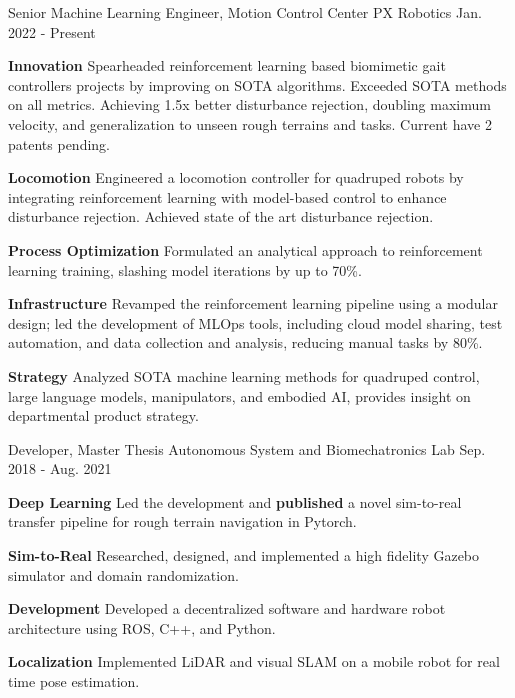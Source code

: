 \begin{cventries}
	\cventry
	{Senior Machine Learning Engineer, Motion Control Center}
	{PX Robotics}
	{Jan. 2022 - Present}
	{}
	{
		\begin{cvitems}
			\item {
				\textbf{Innovation} Spearheaded reinforcement learning based biomimetic gait controllers projects by improving on SOTA algorithms. Exceeded SOTA methods on all metrics. Achieving 1.5x better disturbance rejection, doubling maximum velocity, and generalization to unseen rough terrains and tasks. Current have 2 patents pending.
			}
			\item {
				\textbf{Locomotion} Engineered a locomotion controller for quadruped robots by integrating reinforcement learning with model-based control to enhance disturbance rejection. Achieved state of the art disturbance rejection.
			}
			\item {
				\textbf{Process Optimization} Formulated an analytical approach to reinforcement learning training, slashing model iterations by up to 70\%.
			}
			\item {
				\textbf{Infrastructure} Revamped the reinforcement learning pipeline using a modular design; led the development of MLOps tools, including cloud model sharing, test automation, and data collection and analysis, reducing manual tasks by 80\%.
			}
			\item {
				\textbf{Strategy} Analyzed SOTA machine learning methods for quadruped control, large language models, manipulators, and embodied AI, provides insight on departmental product strategy.
			}
		\end{cvitems}
	}
	\cventry
	{Developer, Master Thesis}
	{Autonomous System and Biomechatronics Lab}
	{Sep. 2018 - Aug. 2021}
	{}
	{
		\begin{cvitems}
			\item {
				\textbf{Deep Learning} Led the development and \textbf{published} a novel sim-to-real transfer pipeline for rough terrain navigation in Pytorch.
			}
			\item {
				\textbf{Sim-to-Real} Researched, designed, and implemented a high fidelity Gazebo simulator and domain randomization.
			}
			\item {
				\textbf{Development} Developed a decentralized software and hardware robot architecture using ROS, C++, and Python.
			}
			\item {
				\textbf{Localization} Implemented LiDAR and visual SLAM on a mobile robot for real time pose estimation.
}
\end{cvitems}}
\end{cventries}
